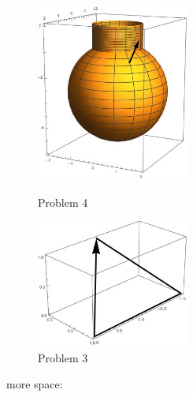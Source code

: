 \documentclass[12pt]{article}
\begin{document}
\begin{enumerate}
 \begin{figure}[h]
 \begin{center}


 \end{center}
 \end{figure}
 
\begin{figure}
\centering
\parbox{5cm}{
 \includegraphics[width=5cm]{grenade.jpeg}
 \caption{Problem 4}
 \label{fig1}}
\qquad
\begin{minipage}{5cm}
\includegraphics[width=5cm]{path.jpeg}
\caption{Problem 3}
\label{fig2}
\end{minipage}
\end{figure} 
 

\newpage
more space:


\end{enumerate}
\end{document}

